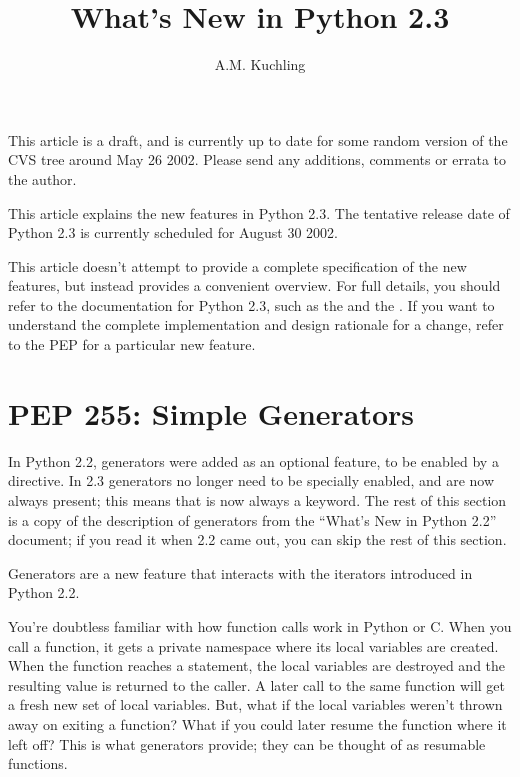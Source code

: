 \documentclass{howto}
\title{What's New in Python 2.3}
\author{A.M. Kuchling}
\begin{document}
\maketitle
\tableofcontents


{\large This article is a draft, and is currently up to date for some
random version of the CVS tree around May 26 2002.  Please send any
additions, comments or errata to the author.}

This article explains the new features in Python 2.3.  The tentative
release date of Python 2.3 is currently scheduled for August 30 2002.

This article doesn't attempt to provide a complete specification of
the new features, but instead provides a convenient overview.  For
full details, you should refer to the documentation for Python 2.3,
such as the
 and the
.  If you want to understand the complete
implementation and design rationale for a change, refer to the PEP for
a particular new feature.


\section{PEP 255: Simple Generators}
\label{section-generators}

In Python 2.2, generators were added as an optional feature, to be
enabled by a  directive.  In
2.3 generators no longer need to be specially enabled, and are now
always present; this means that  is now always a
keyword.  The rest of this section is a copy of the description of
generators from the ``What's New in Python 2.2'' document; if you read
it when 2.2 came out, you can skip the rest of this section.

Generators are a new feature that interacts with the iterators
introduced in Python 2.2.

You're doubtless familiar with how function calls work in Python or
C.  When you call a function, it gets a private namespace where its local
variables are created.  When the function reaches a 
statement, the local variables are destroyed and the resulting value
is returned to the caller.  A later call to the same function will get
a fresh new set of local variables.  But, what if the local variables
weren't thrown away on exiting a function?  What if you could later
resume the function where it left off?  This is what generators
provide; they can be thought of as resumable functions.
\end{document}
